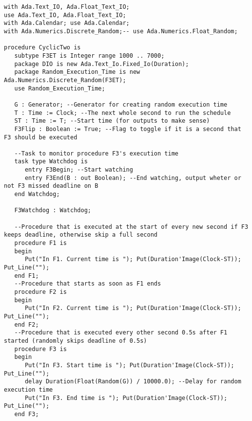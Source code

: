 \documentclass[a4paper,10pt]{article}
\begin{document}
\begin{lstlisting}
with Ada.Text_IO, Ada.Float_Text_IO;
use Ada.Text_IO, Ada.Float_Text_IO;
with Ada.Calendar; use Ada.Calendar;
with Ada.Numerics.Discrete_Random;-- use Ada.Numerics.Float_Random;

procedure CyclicTwo is
   subtype F3ET is Integer range 1000 .. 7000;
   package DIO is new Ada.Text_Io.Fixed_Io(Duration);
   package Random_Execution_Time is new Ada.Numerics.Discrete_Random(F3ET);
   use Random_Execution_Time;
   
   G : Generator; --Generator for creating random execution time
   T : Time := Clock; --The next whole second to run the schedule
   ST : Time := T; --Start time (for outputs to make sense)
   F3Flip : Boolean := True; --Flag to toggle if it is a second that F3 should be executed
   
   --Task to monitor procedure F3's execution time
   task type Watchdog is
      entry F3Begin; --Start watching
      entry F3End(B : out Boolean); --End watching, output wheter or not F3 missed deadline on B
   end Watchdog;
   
   F3Watchdog : Watchdog;
   
   --Procedure that is executed at the start of every new second if F3 keeps deadline, otherwise skip a full second 
   procedure F1 is
   begin
      Put("In F1. Current time is "); Put(Duration'Image(Clock-ST)); Put_Line("");   
   end F1;
   --Procedure that starts as soon as F1 ends
   procedure F2 is
   begin
      Put("In F2. Current time is "); Put(Duration'Image(Clock-ST)); Put_Line("");   
   end F2;
   --Procedure that is executed every other second 0.5s after F1 started (randomly skips deadline of 0.5s)
   procedure F3 is
   begin
      Put("In F3. Start time is "); Put(Duration'Image(Clock-ST)); Put_Line("");
      delay Duration(Float(Random(G)) / 10000.0); --Delay for random execution time 
      Put("In F3. End time is "); Put(Duration'Image(Clock-ST)); Put_Line("");
   end F3;
   

\end{lstlisting}
\end{document}
